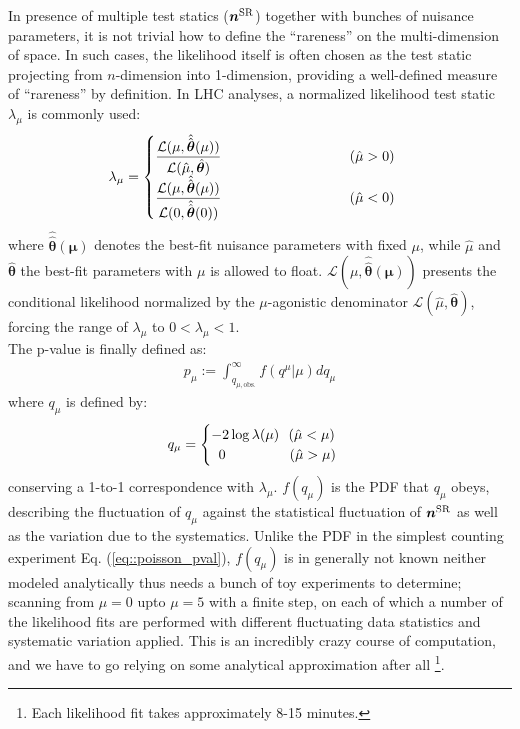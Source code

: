 In presence of multiple test statics ($\bm{n}^{\mathrm{SR}}$) together with bunches of nuisance parameters, it is not trivial how to define the ``rareness'' on the multi-dimension of space. 
In such cases, the likelihood itself is often chosen as the test static projecting from $n$-dimension into 1-dimension, 
providing a well-defined measure of ``rareness'' by definition. 
In LHC analyses, a normalized likelihood test static $\lambda_\mu$ is commonly used:
\begin{align}
\lambda_\mu = 
        \begin{cases}
        \dfrac{ \mathcal{L} (\mu, \hat{\hat{\bm{\theta}}}(\mu)) }{ \mathcal{L} (\hat{\mu}, \hat{\bm{\theta}})  }         \mbox{\phantom{MMMMMMMMMM}} (\hat{\mu}>0)        \\
        \dfrac{ \mathcal{L} (\mu, \hat{\hat{\bm{\theta}}}(\mu)) }{ \mathcal{L} (0, \hat{\hat{\bm{\theta}}}(0))  }  \mbox{\phantom{MMMMMMMMMM}} (\hat{\mu}<0)
        \end{cases}
\end{align}
where $\bm{\hat{\hat{\theta}}(\mu)}$ denotes the best-fit nuisance parameters with fixed $\mu$,
while $\hat{\mu}$ and $\bm{\hat{\theta}}$ the best-fit parameters with $\mu$ is allowed to float. 
$\mathcal{L} (\mu, \bm{\hat{\hat{\theta}}(\mu)})$ presents the conditional likelihood normalized by the $\mu$-agonistic denominator $\mathcal{L} (\hat{\mu}, \bm{\hat{\theta}})$, 
forcing the range of $\lambda_\mu$ to $0<\lambda_\mu<1$. \\

The p-value is finally defined as:
\begin{align}
p_\mu := \int_{q_{\mu,\mathrm{obs.}}}^{\infty}  f(q^{\mu}|\mu) dq_\mu
\end{align}
where $q_{\mu}$ is defined by:
\begin{align}
q_{\mu} = 
        \begin{cases}
        -2 \log\lambda(\mu)     \,\,\,\,  (\hat{\mu} < \mu) \\
        \mbox{\phantom{k}} 0     \mbox{\phantom{MMMMM}} (\hat{\mu} > \mu)
        \end{cases}
\end{align}
conserving a 1-to-1 correspondence with $\lambda_\mu$.
$f(q_\mu)$ is the PDF that $q_\mu$ obeys, describing the fluctuation of $q_\mu$ against the statistical fluctuation of $\bm{n}^{\mathrm{SR}}$ as well as the variation due to the systematics.
Unlike the PDF in the simplest counting experiment Eq. (\ref{eq::poisson_pval}), $f(q_\mu)$ is in generally not known neither modeled analytically thus needs a bunch of toy experiments to determine; 
scanning from $\mu=0$ upto $\mu=5$ with a finite step, on each of which a number of the likelihood fits are performed with different fluctuating data statistics and systematic variation applied. 
This is an incredibly crazy course of computation, and we have to go relying on some analytical approximation after all \footnote{Each likelihood fit takes approximately 8-15 minutes. }. \\

